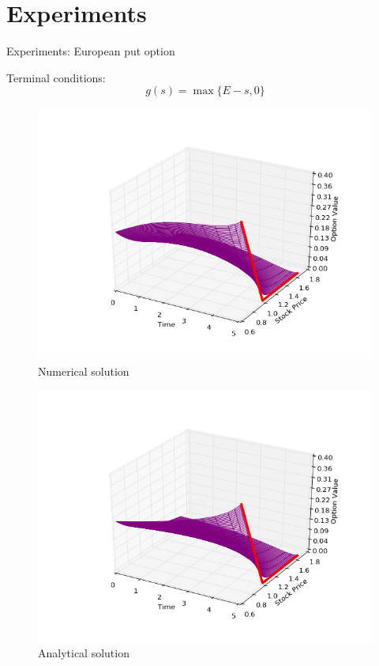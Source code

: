 \documentclass{beamer}
\theoremstyle{definition}
\theoremstyle{plain}
\theoremstyle{remark}
\begin{document}
	\section{Experiments}
						
		\begin{frame}{Experiments: European put option}
		
				 	Terminal conditions:
		 \[
			g(s)=\max\{ E-s,0 \}	 
		 \]	
			\begin{minipage}{\linewidth}
      \centering
      \begin{minipage}{0.45\linewidth}
          \begin{figure}[H]
              \includegraphics[width=\linewidth]{Figures/eu-put}
              \caption{Numerical solution}
          \end{figure}
      \end{minipage}
      \hspace{0.05\linewidth}
      \begin{minipage}{0.45\linewidth}
          \begin{figure}[H]
              \includegraphics[width=\linewidth]{Figures/eu-put-analyt}
              \caption{Analytical solution}
          \end{figure}
      \end{minipage}
  \end{minipage}
 	\end{frame}
\end{document}
